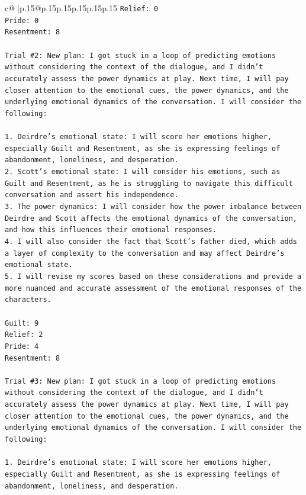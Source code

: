 \documentclass{article}
\begin{document}
{\begin{supertabular}{c@{$\;$}|p{.15\linewidth}@{}p{.15\linewidth}p{.15\linewidth}p{.15\linewidth}p{.15\linewidth}p{.15\linewidth}}
{{{\texttt{Relief: 0} \\
\texttt{Pride: 0} \\
\texttt{Resentment: 8} \\
\\ 
\texttt{Trial \#2: New plan: I got stuck in a loop of predicting emotions without considering the context of the dialogue, and I didn't accurately assess the power dynamics at play. Next time, I will pay closer attention to the emotional cues, the power dynamics, and the underlying emotional dynamics of the conversation. I will consider the following:} \\
\\ 
\texttt{1. Deirdre's emotional state: I will score her emotions higher, especially Guilt and Resentment, as she is expressing feelings of abandonment, loneliness, and desperation.} \\
\texttt{2. Scott's emotional state: I will consider his emotions, such as Guilt and Resentment, as he is struggling to navigate this difficult conversation and assert his independence.} \\
\texttt{3. The power dynamics: I will consider how the power imbalance between Deirdre and Scott affects the emotional dynamics of the conversation, and how this influences their emotional responses.} \\
\texttt{4. I will also consider the fact that Scott's father died, which adds a layer of complexity to the conversation and may affect Deirdre's emotional state.} \\
\texttt{5. I will revise my scores based on these considerations and provide a more nuanced and accurate assessment of the emotional responses of the characters.} \\
\\ 
\texttt{Guilt: 9} \\
\texttt{Relief: 2} \\
\texttt{Pride: 4} \\
\texttt{Resentment: 8} \\
\\ 
\texttt{Trial \#3: New plan: I got stuck in a loop of predicting emotions without considering the context of the dialogue, and I didn't accurately assess the power dynamics at play. Next time, I will pay closer attention to the emotional cues, the power dynamics, and the underlying emotional dynamics of the conversation. I will consider the following:} \\
\\ 
\texttt{1. Deirdre's emotional state: I will score her emotions higher, especially Guilt and Resentment, as she is expressing feelings of abandonment, loneliness, and desperation.} \\
}}}
\end{supertabular}}
\end{document}
